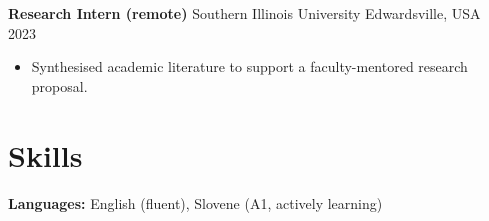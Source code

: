 \documentclass[a4paper,10.5pt]{article}
\newif\ifDEV \newif\ifCOORD \newif\ifRND
\newcommand{\datefill}{\dotfill}
\newcommand{\entry}[3]{\vspace{2.5pt}\noindent\textbf{#1} \textbar{} #2 \datefill{} #3\par\vspace{0.5pt}}
\newcommand{\skillrow}[2]{\noindent\textbf{#1:} #2\par\vspace{1pt}}
\begin{document}
\entry{Research Intern (remote)}{Southern Illinois University Edwardsville, USA}{ 2023}
\begin{itemize}
  \item Synthesised academic literature to support a faculty-mentored research proposal.
\end{itemize}

\section{Skills}
\ifDEV
\skillrow{Programming \& Data}{Python, TypeScript, Neo4j, Cypher, knowledge graphs, Git}
\skillrow{AI / LLM}{Agentic systems, Model Context Protocol (MCP), RAG, LLM evaluation and benchmarking}
\skillrow{BIM \& AEC}{IFC (IFC2X3, IFC4, IFC4X3), IfcOpenShell, Linked Building Data ontologies, ISO 19650, Revit, Dynamo, Blender, Autodesk Construction Cloud, Three.js, web-ifc}
\fi
\ifCOORD
\skillrow{BIM \& AEC}{IFC (IFC2X3, IFC4, IFC4X3), ISO 19650, Employer's Information Requirements, clash detection, federated models, Revit, Dynamo, Autodesk Construction Cloud, IfcOpenShell, Linked Building Data ontologies}
\skillrow{Programming \& Data}{Python, TypeScript, Neo4j, Cypher, knowledge graphs, Git}
\skillrow{AI / LLM}{Agentic systems, Model Context Protocol (MCP), RAG, LLM evaluation and benchmarking}
\fi
\ifRND
\skillrow{AI / LLM}{Agentic systems, Model Context Protocol (MCP), RAG, LLM evaluation and benchmarking, knowledge graphs}
\skillrow{Programming \& Data}{Python, TypeScript, Neo4j, Cypher, Git}
\skillrow{BIM \& AEC}{IFC (IFC2X3, IFC4, IFC4X3), IfcOpenShell, Linked Building Data ontologies, ISO 19650, Revit, Dynamo, Blender, Autodesk Construction Cloud, Three.js, web-ifc}
\fi
\skillrow{Languages}{English (fluent), Slovene (A1, actively learning)}
\end{document}
